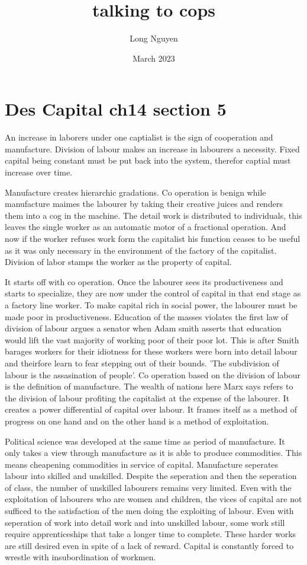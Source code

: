 \documentclass{article}
\title{talking to cops}
\author{Long Nguyen}
\date{March 2023}
\begin{document}
\maketitle

\section{Des Capital ch14 section 5}
An increase in laborers under one captialist is the sign of cooperation and manufacture. Division of labour makes an increase in labourers a necessity. Fixed capital being constant must be put back into the system, therefor captial must increase over time.

Manufacture creates hierarchic gradations. Co operation is benign while manufacture maimes the labourer by taking their creative juices and renders them into a cog in the machine. The detail work is distributed to individuals, this leaves the single worker as an automatic motor of a fractional operation. And now if the worker refuses work form the capitalist his function ceases to be useful as it was only necessary in the environment of the factory of the capitalist. Division of labor stamps the worker as the property of capital.

It starts off with co operation. Once the labourer sees its productiveness and starts to specialize, they are now under the control of capital in that end stage as a factory line worker. To make capital rich in social power, the labourer must be made poor in productiveness. Education of the masses violates the first law of division of labour argues a senator when Adam smith asserts that education would lift the vast majority of working poor of their poor lot. This is after Smith barages workers for their idiotness for these workers were born into detail labour and theirfore learn to fear stepping out of their bounds. 'The subdivision of labour is the assasination of people'. Co operation based on the division of labour is the definition of manufacture. The wealth of nations here Marx says refers to the division of labour profiting the capitalist at the expense of the labourer. It creates a power differential of capital over labour. It frames itself as a method of progress on one hand and on the other hand is a method of exploitation.

Political science was developed at the same time as period of manufacture. It only takes a view through manufacture as it is able to produce commodities. This means cheapening commodities in service of capital. Manufacture seperates labour into skilled and unskilled. Despite the seperation and then the seperation of class, the number of unskilled labourers remains very limited. Even with the exploitation of labourers who are women and children, the vices of capital are not sufficed to the satisfaction of the men doing the exploiting of labour. Even with seperation of work into detail work and into unskilled labour, some work still require apprenticeships that take a longer time to complete. These harder works are still desired even in spite of a lack of reward. Capital is constantly forced to wrestle with insubordination of workmen. 
\end{document}
